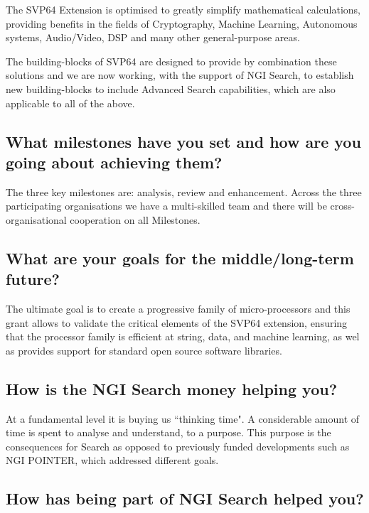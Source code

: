 The \acrshort{SVP64} Extension is optimised to greatly simplify mathematical calculations,
providing benefits in the fields of Cryptography, Machine Learning,
Autonomous systems, Audio/Video, \acrfull{DSP} and many other general-purpose areas.
 
The building-blocks of \acrshort{SVP64} are designed to provide by combination these
solutions and we are now working, with the support of \acrshort{NGI} Search, to
establish new building-blocks to include Advanced Search capabilities,
which are also applicable to all of the above.

\subsection{What milestones have you set and how are you going about achieving them?}

The three key milestones are: analysis, review and enhancement.
Across the three participating organisations we have a multi-skilled
team and there will be cross-organisational cooperation on all Milestones.

\subsection{What are your goals for the middle/long-term future?}

The ultimate goal is to create a progressive family of micro-processors
and this grant allows to validate the critical elements of the
\acrshort{SVP64} extension, ensuring that the processor family is efficient at string,
data, and machine learning, as wel as provides support for standard open
source software libraries.

\subsection{How is the \acrshort{NGI} Search money helping you?}

At a fundamental level it is buying us ``thinking time".
A considerable amount of time is spent to analyse and understand,
to a purpose. This purpose is the consequences for Search as
opposed to previously funded developments such as \acrshort{NGI} POINTER,
which addressed different goals.

\subsection{How has being part of \acrshort{NGI} Search helped you?}

